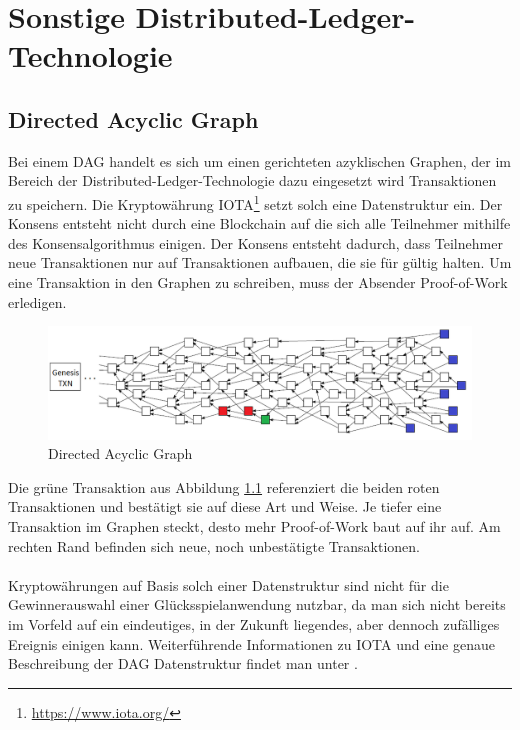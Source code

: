 \chapter{Sonstige Distributed-Ledger-Technologie}
\section{Directed Acyclic Graph}
Bei einem DAG handelt es sich um einen gerichteten azyklischen Graphen, der im Bereich der  Distributed-Ledger-Technologie dazu eingesetzt wird Transaktionen zu speichern.
Die Kryptowährung IOTA\footnote{\url{https://www.iota.org/}} setzt solch eine Datenstruktur ein. Der Konsens entsteht nicht durch eine Blockchain auf die sich alle Teilnehmer mithilfe des Konsensalgorithmus einigen. Der Konsens entsteht dadurch, dass Teilnehmer neue Transaktionen nur auf Transaktionen aufbauen, die sie für gültig halten. Um eine Transaktion in den Graphen zu schreiben, muss der Absender Proof-of-Work erledigen.

\begin{figure}[H]
\centering
\includegraphics[width=1\linewidth]{Figures/tangle}
\decoRule
\caption{Directed Acyclic Graph \cite{tangle_whitepaper}}
\label{fig:tangle}
\end{figure}

Die grüne Transaktion aus Abbildung \ref{fig:tangle} referenziert die beiden roten Transaktionen und bestätigt sie auf diese Art und Weise. Je tiefer eine Transaktion im Graphen steckt, desto mehr Proof-of-Work baut auf ihr auf. Am rechten Rand befinden sich neue, noch unbestätigte Transaktionen.\\\\
Kryptowährungen auf Basis solch einer Datenstruktur sind nicht für die Gewinnerauswahl einer Glücksspielanwendung nutzbar, da man sich nicht bereits im Vorfeld auf ein eindeutiges, in der Zukunft liegendes, aber dennoch zufälliges Ereignis einigen kann. Weiterführende Informationen zu IOTA und eine genaue Beschreibung der DAG Datenstruktur findet man unter \cite{tangle_whitepaper}.


